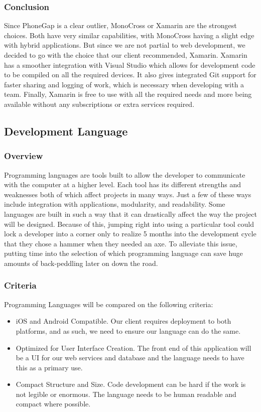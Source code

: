 \documentclass[onecolumn, draftclsnofoot,10pt, compsoc]{IEEEtran}
\begin{document}
\subsubsection{Conclusion}
Since PhoneGap is a clear outlier, MonoCross or Xamarin are the strongest choices. Both have very similar capabilities, with MonoCross having a slight edge with hybrid applications.
But since we are not partial to web development, we decided to go with the choice that our client recommended, Xamarin. Xamarin has a smoother integration with Visual Studio which 
allows for development code to be compiled on all the required devices. It also gives integrated Git support for faster sharing and logging of work,
which is necessary when developing with a team. Finally, Xamarin is free to use with all the required needs and more being available without any subscriptions or extra services required. 


\subsection{Development Language}
\subsubsection{Overview}

Programming languages are tools built to allow the developer to communicate with the computer at a higher level. Each tool has its different strengths and weaknesses both of
which affect projects in many ways. Just a few of these ways include integration with applications, modularity, and readability. Some languages are built in such a way that it 
can drastically affect the way the project will be designed. Because of this, jumping right into using a particular tool could lock a developer into a corner only to realize
5 months into the development cycle that they chose a hammer when they needed an axe. To alleviate this issue, putting time into the selection of which programming language can save
huge amounts of back-peddling later on down the road.

\subsubsection{Criteria}
Programming Languages will be compared on the following criteria:
\begin{itemize}
	\item iOS and Android Compatible. Our client requires deployment to both platforms, and as such, we need to ensure our language can do the same.
	\item Optimized for User Interface Creation. The front end of this application will be a UI for our web services and database and the language needs to  have this as a  primary  use.
	\item Compact Structure and Size. Code development can be hard if the work is not legible or enormous. The language needs to be human readable and compact where possible.
\end{itemize}
\end{document}
